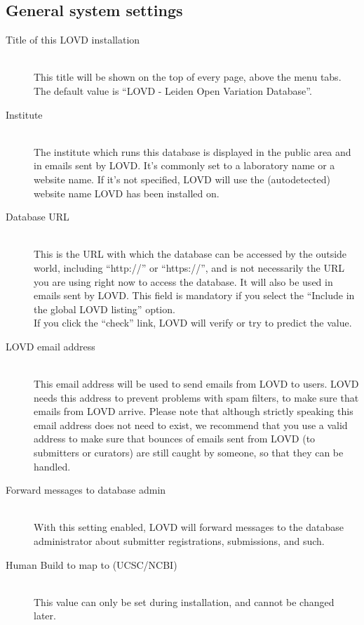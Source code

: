 \subsection{General system settings}
\begin{description}
  \item[Title of this LOVD installation] \hfill \\
  This title will be shown on the top of every page, above the menu tabs.
  The default value is ``LOVD - Leiden Open Variation Database''.
  \item[Institute] \hfill \\
  The institute which runs this database is displayed in the public area and in emails sent by LOVD.
  It's commonly set to a laboratory name or a website name.
  If it's not specified, LOVD will use the (autodetected) website name LOVD has been installed on.
  \pagebreak[4] %
  \item[Database URL] \hfill \\
  This is the URL with which the database can be accessed by the outside world, including ``http://'' or ``https://'',
   and is not necessarily the URL you are using right now to access the database.
  It will also be used in emails sent by LOVD.
  This field is mandatory if you select the ``Include in the global LOVD listing'' option.
  \\
  If you click the ``check'' link, LOVD will verify or try to predict the value.
  \item[LOVD email address] \hfill \\
  This email address will be used to send emails from LOVD to users.
  LOVD needs this address to prevent problems with spam filters, to make sure that emails from LOVD arrive.
  Please note that although strictly speaking this email address does not need to exist,
   we recommend that you use a valid address to make sure that bounces of emails sent from LOVD
   (to submitters or curators) are still caught by someone, so that they can be handled.
  \item[Forward messages to database admin] \hfill \\
  With this setting enabled, LOVD will forward messages to the database administrator about submitter registrations,
   submissions, and such.
  \item[Human Build to map to (UCSC/NCBI)] \hfill \\
  This value can only be set during installation, and cannot be changed later.

\end{description}
